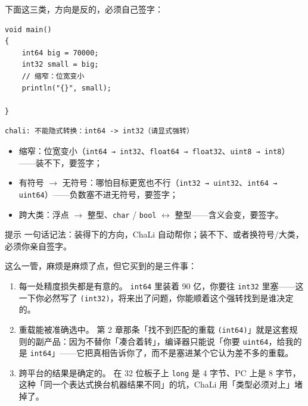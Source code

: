 下面这三类，方向是反的，必须自己签字：

\par
\medskip
\begin{lstlisting}[style=chali]
void main()
{
    int64 big = 70000;
    int32 small = big;
    // 缩窄：位宽变小
    println("{}", small);

}
\end{lstlisting}
\par
\medskip

\par
\medskip
\begin{lstlisting}[style=out]
chali: 不能隐式转换：int64 -> int32（请显式强转）
\end{lstlisting}
\par
\medskip

\begin{itemize}

\item 缩窄：位宽变小（\texttt{int64 → int32}、\texttt{float64 → float32}、\texttt{uint8 → int8}）——装不下，要签字；

\item 有符号 \ensuremath{\rightarrow} 无符号：哪怕目标更宽也不行（\texttt{int32 → uint32}、\texttt{int64 → uint64}）——负数塞不进无符号，要签字；

\item 跨大类：浮点 \ensuremath{\rightarrow} 整型、\texttt{char} / \texttt{bool} \ensuremath{\leftrightarrow} 整型——含义会变，要签字。

\end{itemize}

\begin{tip}{提示}
一句话记法：装得下的方向，ChaLi 自动帮你；装不下、或者换符号/大类，必须你亲自签字。
\end{tip}

这么一管，麻烦是麻烦了点，但它买到的是三件事：

\begin{enumerate}

\item 每一处精度损失都是有意的。 \texttt{int64} 里装着 90 亿，你要往 \texttt{int32} 里塞——这一下你必然写了 \texttt{(\allowbreak{}int32)\allowbreak{}}，将来出了问题，你能顺着这个强转找到是谁决定的。

\item 重载能被准确选中。 第 2 章那条「找不到匹配的重载 \texttt{(\allowbreak{}int64)\allowbreak{}}」就是这套规则的副产品：因为不替你「凑合着转」，编译器只能说「你要 \texttt{uint64}，给我的是 \texttt{int64}」——它把真相告诉你了，而不是塞进某个它认为差不多的重载。

\item 跨平台的结果是确定的。 在 32 位板子上 \texttt{long} 是 4 字节、PC 上是 8 字节，这种「同一个表达式换台机器结果不同」的坑，ChaLi 用「类型必须对上」堵掉了。

\end{enumerate}

